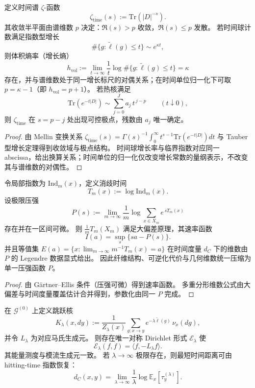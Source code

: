\begin{theorem}\label{thm:xi-time-zeta-singularity-from-growth}
定义时间谱 \(\zeta\)-函数
\[
\zeta_{\mathrm{time}}(s):=\mathrm{Tr}(|D|^{-s}).
\]
其收敛半平面由谱维数 \(p\) 决定：\(\Re(s)>p\) 收敛，\(\Re(s)\le p\) 发散。
若时间球计数满足指数型增长
\[
\#\{g:\widetilde\ell(g)\le t\}\sim e^{\kappa t},
\]
则体积熵率（增长熵）
\[
h_{\mathrm{vol}}
:=\lim_{t\to\infty}\frac{1}{t}\log \#\{g:\widetilde\ell(g)\le t\}
=\kappa
\]
存在，并与谱维数处于同一增长标尺的对偶关系；在时间单位归一化下可取 \(p=\kappa-1\)（即 \(h_{\mathrm{vol}}=p+1\)）。
若热核满足
\[
\mathrm{Tr}(e^{-t|D|})
\sim
\sum_{j=0}^{J}a_j\,t^{\,j-p}
\qquad(t\downarrow 0),
\]
则 \(\zeta_{\mathrm{time}}\) 在 \(s=p-j\) 处出现可控极点，残数由 \(a_j\) 唯一确定。
\end{theorem}

\begin{proof}
由 Mellin 变换关系
\(
\zeta_{\mathrm{time}}(s)=\Gamma(s)^{-1}\int_0^\infty t^{s-1}\mathrm{Tr}(e^{-t|D|})dt
\)
与 Tauber 型增长定理得到收敛域与极点结构。
时间球增长率与临界指数对应同一 abscissa，给出换算关系；时间单位的归一化仅改变增长常数的量纲表示，不改变其与谱维数的对偶性。
\end{proof}



\begin{theorem}\label{thm:xi-fiber-time-multifractal-legendre}
令局部指数为 \(\mathrm{Ind}_m(x)\)，定义消歧时间
\[
T_m(x):=\log \mathrm{Ind}_m(x).
\]
设极限压强
\[
P(s):=\lim_{m\to\infty}\frac1m\log\sum_{x\in X_m}e^{\,sT_m(x)}
\]
存在并在一区间可微。
则 \(\frac1mT_m(X_m)\) 满足大偏差原理，其速率函数
\[
I(a)=\sup_s\{sa-P(s)\}.
\]
并且等值集
\(
E(a)=\{x:\lim_{m\to\infty}m^{-1}T_m(x)=a\}
\)
在时间度量 \(d_C\) 下的维数由 \(P\) 的 Legendre 数据显式给出。
因此纤维结构、可逆化代价与几何维数统一压缩为单一压强函数 \(P\)。
\end{theorem}

\begin{proof}
由 G\"artner--Ellis 条件（压强可微）得到速率函数。
多重分形维数公式由大偏差与时间度量覆盖估计合并得到，参数化由同一 \(P\) 完成。
\end{proof}

\begin{theorem}\label{thm:xi-time-induced-dirichlet-form}
在 \(\mathcal G^{(0)}\) 上定义跳跃核
\[
K_\lambda(x,dy)
:=
\frac{1}{Z_\lambda(x)}
\sum_{g:x\to y}
e^{-\lambda\widetilde\ell(g)}\,\nu_x(dg),
\]
并令 \(L_\lambda\) 为对应马氏生成元。
则存在唯一对称 Dirichlet 形式 \(\mathcal E_\lambda\) 使
\[
\mathcal E_\lambda(f,f)=\langle f,-L_\lambda f\rangle.
\]
其能量测度与模流生成元一致。
若 \(\lambda\to\infty\) 极限存在，则最短时间距离可由 hitting-time 指数恢复：
\[
d_C(x,y)
=
\lim_{\lambda\to\infty}
\frac{1}{\lambda}\log\mathbb E_x[\tau_y^{(\lambda)}].
\]
\end{theorem}

